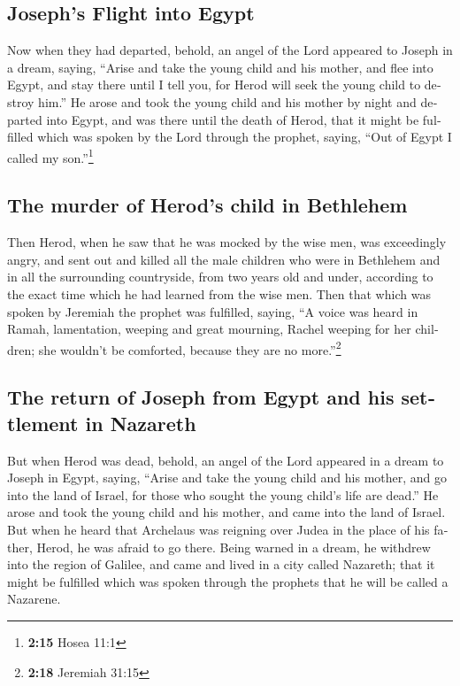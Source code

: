 \begin{paracol}{2}
\begin{otherlanguage}{english}
{\subsection{Joseph's Flight into
Egypt}\label{josephs-flight-into-egypt}}

 Now when they had departed, behold, an angel of the Lord
appeared to Joseph in a dream, saying, ``Arise and take the young child
and his mother, and flee into Egypt, and stay there until I tell you,
for Herod will seek the young child to destroy him.''  He
arose and took the young child and his mother by night and departed into
Egypt,  and was there until the death of Herod, that it
might be fulfilled which was spoken by the Lord through the prophet,
saying, ``Out of Egypt I called my son.''\footnote{\textbf{2:15} Hosea
  11:1}

\hypertarget{the-murder-of-herods-child-in-bethlehem}{%
\subsection{The murder of Herod's child in
Bethlehem}\label{the-murder-of-herods-child-in-bethlehem}}

 Then Herod, when he saw that he was mocked by the wise
men, was exceedingly angry, and sent out and killed all the male
children who were in Bethlehem and in all the surrounding countryside,
from two years old and under, according to the exact time which he had
learned from the wise men.  Then that which was spoken by
Jeremiah the prophet was fulfilled, saying,  ``A voice
was heard in Ramah, lamentation, weeping and great mourning, Rachel
weeping for her children; she wouldn't be comforted, because they are no
more.''\footnote{\textbf{2:18} Jeremiah 31:15}

\hypertarget{the-return-of-joseph-from-egypt-and-his-settlement-in-nazareth}{%
\subsection{The return of Joseph from Egypt and his settlement in
Nazareth}\label{the-return-of-joseph-from-egypt-and-his-settlement-in-nazareth}}

 But when Herod was dead, behold, an angel of the Lord
appeared in a dream to Joseph in Egypt, saying,  ``Arise
and take the young child and his mother, and go into the land of Israel,
for those who sought the young child's life are dead.'' 
He arose and took the young child and his mother, and came into the land
of Israel.  But when he heard that Archelaus was reigning
over Judea in the place of his father, Herod, he was afraid to go there.
Being warned in a dream, he withdrew into the region of Galilee,
 and came and lived in a city called Nazareth; that it
might be fulfilled which was spoken through the prophets that he will be
called a Nazarene.


\end{otherlanguage}
\end{paracol}
